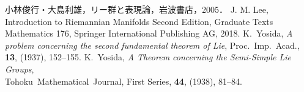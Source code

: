  小林俊行・大島利雄，リー群と表現論，岩波書店，2005．
 J. M. Lee, Introduction to Riemannian Manifolds Second Edition, Graduate Texts Mathematics 176, Springer International Publishing AG, 2018.
 K.~Yosida, \textit{A problem concerning the second fundamental theorem of Lie}, Proc.~Imp.~Acad., \textbf{13}, (1937), 152--155.
 K.~Yosida, \textit{A Theorem concerning the Semi-Simple Lie Groups}, \\Tohoku~Mathematical~Journal, First Series, \textbf{44}, (1938), 81--84.


